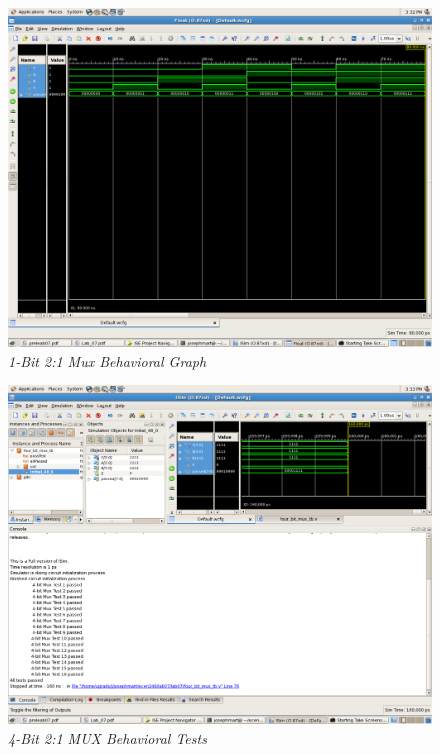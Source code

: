 \documentclass[a4paper,12pt]{article}
\begin{document}
  \newpage

  \begin{figure}[h]
    \begin{center}
      \includegraphics[scale=0.18]{1_1_2.png}
      \caption{\textit{1-Bit 2:1 Mux Behavioral Graph}}
    \end{center}
  \end{figure}

  \begin{figure}[h]
    \begin{center}
      \includegraphics[scale=0.18]{1_2_1.png}
      \caption{\textit{4-Bit 2:1 MUX Behavioral Tests}}
    \end{center}
  \end{figure}
\end{document}
